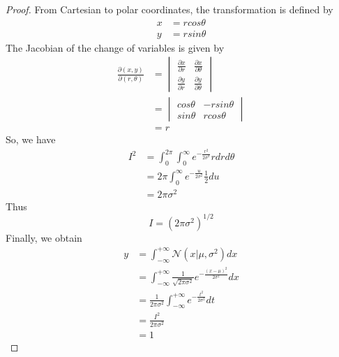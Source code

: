 \documentclass[12pt]{article}
\newenvironment{exercise}[2][Ex]{\begin{trivlist}
\item[\hskip \labelsep {\bfseries #1}\hskip \labelsep {\bfseries #2.}]}{\end{trivlist}}
\begin{document}
\begin{exercise}{1.7(**)}
    \begin{proof}
        From Cartesian to polar coordinates, the transformation is defined by
        \begin{equation*}
            \begin{split}
                x&=rcos\theta\\
                y&=rsin\theta
            \end{split}
        \end{equation*}
        The Jacobian of the change of variables is given by
        \begin{align*}
            \frac{\partial(x,y)}{\partial(r,\theta)}&=\begin{vmatrix}
                \frac{\partial x}{\partial r}&\frac{\partial x}{\partial \theta}\\
                \frac{\partial y}{\partial r}&\frac{\partial y}{\partial \theta}
            \end{vmatrix}\\
            &=\begin{vmatrix}
                cos\theta & -rsin\theta\\
                sin\theta & rcos\theta
            \end{vmatrix}\\
            &=r
        \end{align*}
        So, we have
        \begin{align*}
            I^2&=\int_0^{2\pi}\int_0^\infty e^{-\frac{r^2}{2\sigma^2}}rdrd\theta\\
            &=2\pi\int_0^\infty e^{-\frac{u}{2\sigma^2}}\frac{1}{2}du\\
            &=2\pi\sigma^2
        \end{align*}
        Thus
        \begin{equation}
            \label{eqI}
            I=(2\pi\sigma^2)^{1/2}
        \end{equation}
        Finally, we obtain
        \begin{align*}
            y&=\int_{-\infty}^{+\infty}\mathcal{N}(x|\mu,\sigma^2)dx\\
            &=\int_{-\infty}^{+\infty}\frac{1}{\sqrt{2\pi\sigma^2}}e^{-\frac{(x-\mu)^2}
            {2\sigma^2}}dx\\
            &=\frac{1}{2\pi\sigma^2}\int_{-\infty}^{+\infty}e^{-\frac{t^2}{2\sigma^2}}dt\\
            &=\frac{I^2}{2\pi\sigma^2}\\
            &=1
        \end{align*}
    \end{proof}
\end{exercise}
\end{document}
